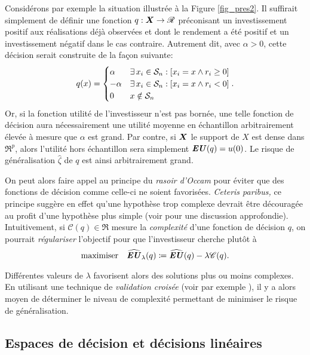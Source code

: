 Considérons par exemple la situation illustrée à la Figure \ref{fig_pres2}. Il suffirait
simplement de définir une fonction $q:\X\to\Re$ préconisant un investissement positif aux
réalisations déjà observées et dont le rendement a été positif et un investissement
négatif dans le cas contraire. Autrement dit, avec $\alpha>0$, cette décision serait construite
de la façon suivante:
\begin{equation}
  q(x) =
  \begin{cases}
     \alpha & \exists\,x_i \in \S_n: [x_i = x \wedge r_i \geq 0]\\
    -\alpha & \exists\,x_i \in \S_n: [x_i = x \wedge r_i < 0]\\
     0 & x \notin \S_n
  \end{cases}.
\end{equation}
Or, si la fonction utilité de l'investisseur n'est pas bornée, une telle fonction de
décision aura nécessairement une utilité moyenne en échantillon arbitrairement élevée à
mesure que $\alpha$ est grand. Par contre, si $\X$ le support de $X$ est dense dans
$\Re^p$, alors l'utilité hors échantillon sera simplement $\EU(q) = u(0)$. Le risque de
généralisation $\hat\zeta$ de $q$ est ainsi arbitrairement grand.

On peut alors faire appel au principe du \textit{rasoir d'Occam} pour éviter que des
fonctions de décision comme celle-ci ne soient favorisées. \textit{Ceteris paribus,} ce
principe suggère en effet qu'une hypothèse trop complexe devrait être découragée au profit
d'une hypothèse plus simple (voir \cite{vapnik1998statistical} pour une discussion
approfondie). Intuitivement, si $\mathscr{C}(q) \in \Re$ mesure la \textit{complexité} d'une
fonction de décision $q$, on pourrait \textit{régulariser} l'objectif pour que
l'investisseur cherche plutôt à
\begin{equation}
  \maximizeEquation{\hEU_\lambda(q) \coloneq \hEU(q) - \lambda\mathscr{C}(q).}
\end{equation}
Différentes valeurs de $\lambda$ favorisent alors des solutions plus ou moins complexes. En
utilisant une technique de \textit{validation croisée} (voir par exemple
\cite{bishop2006pattern}), il y a alors moyen de déterminer le niveau de complexité
permettant de minimiser le risque de généralisation.

\subsection{Espaces de décision et décisions linéaires}

